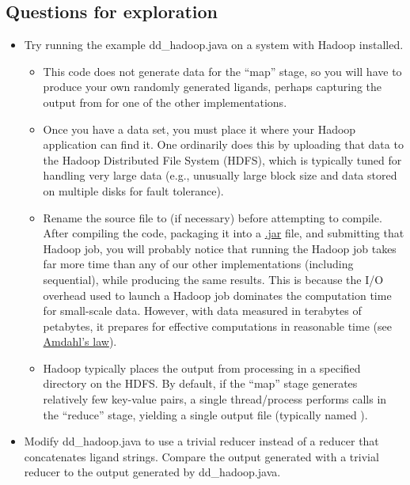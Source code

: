 \documentclass[letterpaper,10pt,openany,oneside]{sphinxmanual}
\begin{document}
\subsection{Questions for exploration}
\label{hadoop/hadoop:questions-for-exploration}\begin{itemize}
\item {} 
Try running the example dd\_hadoop.java on a system with Hadoop installed.
\begin{itemize}
\item {} 
This code does not generate data for the “map” stage, so you will have to produce your own randomly generated ligands, perhaps capturing the output from  for one of the other implementations.

\item {} 
Once you have a data set, you must place it where your Hadoop application can find it.  One ordinarily does this by uploading that data to the Hadoop Distributed File System (HDFS), which is typically tuned for handling very large data (e.g., unusually large block size and data stored on multiple disks for fault tolerance).

\item {} 
Rename the source file to  (if necessary) before attempting to compile. After compiling the code, packaging it into a \href{http://en.wikipedia.org/wiki/JAR\_(file\_format)}{.jar} file, and submitting that Hadoop job, you will probably notice that running the Hadoop job takes far more time than any of our other implementations (including sequential), while producing the same results. This is because the I/O overhead used to launch a Hadoop job dominates the computation time for small-scale data. However, with data measured in terabytes of petabytes, it prepares for effective computations in reasonable time (see \href{http://home.wlu.edu/~whaleyt/classes/parallel/topics/amdahl.html}{Amdahl's law}).

\item {} 
Hadoop typically places the output from processing in a specified directory on the HDFS. By default, if the “map” stage generates relatively few key-value pairs, a single thread/process performs  calls in the “reduce” stage, yielding a single output file (typically named ).

\end{itemize}

\item {} 
Modify dd\_hadoop.java to use a trivial reducer instead of a reducer that concatenates ligand strings. Compare the output generated with a trivial reducer to the output generated by dd\_hadoop.java.


\end{itemize}
\end{document}
